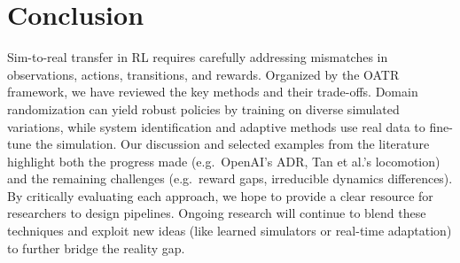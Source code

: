 \section{Conclusion}
Sim-to-real transfer in RL requires carefully addressing mismatches in observations, actions, transitions, and rewards. Organized by the OATR framework, we have reviewed the key methods and their trade-offs. Domain randomization can yield robust policies by training on diverse simulated variations, while system identification and adaptive methods use real data to fine-tune the simulation. Our discussion and selected examples from the literature highlight both the progress made (e.g.\ OpenAI’s ADR, Tan et al.’s locomotion) and the remaining challenges (e.g.\ reward gaps, irreducible dynamics differences). By critically evaluating each approach, we hope to provide a clear resource for researchers to design \simtoreal pipelines. Ongoing research will continue to blend these techniques and exploit new ideas (like learned simulators or real-time adaptation) to further bridge the reality gap.